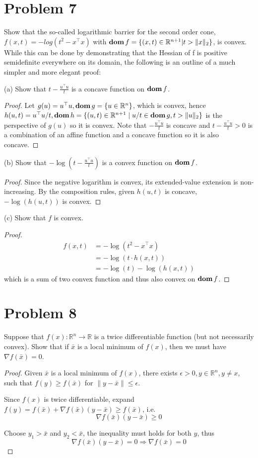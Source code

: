 \documentclass[11pt]{article}
\newcommand{\grad}{\nabla}
\newcommand{\RR}{\mathbb{R}}
\newcommand{\T}{^\top}
\begin{document}
\clearpage
\section*{Problem 7}
Show that the so-called logarithmic barrier for the second order cone, $f(x, t) = -log(t^2 - x\T x)$ with $\dom f = \{(x,t) \in \RR^{n+1} | t>\|x\|_2\}$, is convex.
While this can be done by demonstrating that the Hessian of f is positive semidefinite everywhere on its domain, the following is an outline of a much simpler and more elegant proof:

(a) Show that $t-\frac{u\T u}{t}$ is a concave function on $\mathop{\textbf{dom}} f$.
\begin{proof}
  Let $g(u) = u\T u, \dom g=\{u\in \RR^n\}$, which is convex, hence $h(u, t) = u\T u/t, \dom h = \{(u, t)\in \RR^{n+1} \mid u/t \in \dom g, t>\|u\|_2\}$ is the perspective of $g(u)$ so it is convex. Note that $- \frac{u\T u}{t}$ is concave and $t-\frac{u\T u}{t}>0$ is a combination of an affine function and a concave function so it is also concave.
\end{proof}

(b) Show that $-\log (t - \frac{u\T u}{t})$ is a convex function on $\mathop{\textbf{dom}} f$.
\begin{proof}
  Since the negative logarithm is convex, its extended-value extension is non-increasing. By the composition rules, given $h(u, t)$ is concave, $-\log(h(u,t))$ is convex.
\end{proof}

(c) Show that $f$ is convex.
\begin{proof}
  \begin{align*}
    f(x, t)
    &= -\log(t^2 - x\T x)\\
    &= -\log(t\cdot h(x, t))\\
    &= -\log(t) - \log(h(x, t))
  \end{align*}
  which is a sum of two convex function and thus also convex on $\mathop{\textbf{dom}} f$.
\end{proof}

\clearpage
\section*{Problem 8}
Suppose that $f(x): \RR^n \rightarrow \RR$ is a twice differentiable function (but not necessarily convex). Show that if $\bar x$ is a local minimum of $f(x)$, then we must have $\grad f(\bar x) = 0$.

\begin{proof}
  Given $\bar x$ is a local minimum of $f(x)$, there exists $\epsilon>0, y\in \RR^n, y\neq x$, such that $f(y) \geq f(\bar x)$ for $\|y - \bar x\| \leq \epsilon$.

  Since $f(x)$ is twice differentiable, expand $f(y) = f(\bar x) + \grad f(\bar x) (y - \bar x) \geq f(\bar x)$, i.e. 
  $$\grad f(\bar x) (y - \bar x) \geq 0$$

  Choose $y_1>\bar x$ and $y_2 < \bar x$, the inequality must holds for both $y$, thus 
  \[
    \grad f(\bar x) (y - \bar x) = 0 \Rightarrow \grad f(\bar x) = 0
  \]
\end{proof}
\end{document}
